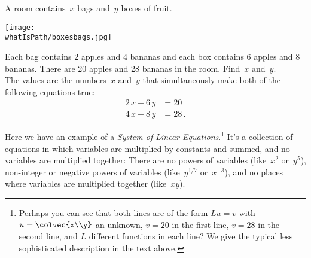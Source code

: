 \begin{example} 
A room contains~$x$ bags and~$y$ boxes of fruit.
\begin{center}
\texttt{[image: \\whatIsPath/boxesbags.jpg]}
\end{center}
Each bag contains 2 apples and 4 bananas and each box contains 6 apples and 8 bananas. 
There are 20 apples and 28 bananas in the room. Find~$x$ and~$y$.
\\


\noindent
The values are the numbers~$x$ and~$y$ that simultaneously make both of the following equations true:
\begin{align*}
	2\, x + 6\, y & =  20 \\
	4\, x + 8\, y & = 28\, .
\end{align*}
\end{example}
Here we have an example of a \emph{System of Linear Equations}.\footnote{Perhaps you can see that both lines are of the form $Lu=v$ with $u=\colvec{x\\y}$ an unknown, $v=20$ in the first line, $v=28$ in the second line, and $L$ different functions in each line? We give the typical less sophisticated description in the text above.}   
It's a collection of equations in which variables are multiplied by constants and summed, and no variables are multiplied together:  There are no powers of variables 
(like~$x^2$ or~$y^5$), non-integer or negative powers of variables (like~$y^{1/7}$ or~$x^{-3}$), and no places where variables are multiplied together (like~$xy$).

